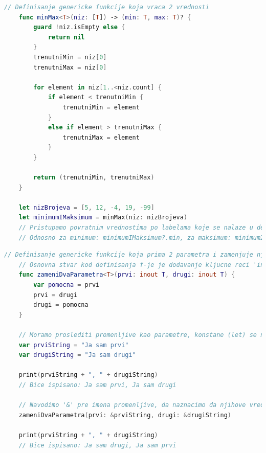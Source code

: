 \documentclass[12pt,oneside]{memoir}
\begin{document}
\begin{lstlisting}[caption=\textit{{Дефинисање и позивање функције са више повратних вредности}}, label={lst:Дефинисање и позивање функције са више повратних вредности}, language=Swift, frame=single]
    // Definisanje genericke funkcije koja vraca 2 vrednosti
    func minMax<T>(niz: [T]) -> (min: T, max: T)? {
        guard !niz.isEmpty else {
            return nil
        }
        trenutniMin = niz[0]
        trenutniMax = niz[0]
        
        for element in niz[1..<niz.count] {
            if element < trenutniMin {
                trenutniMin = element
            }
            else if element > trenutniMax {
                trenutniMax = element
            }
        } 
        
        return (trenutniMin, trenutniMax)
    }
    
    let nizBrojeva = [5, 12, -4, 19, -99]
    let minimumIMaksimum = minMax(niz: nizBrojeva)
    // Pristupamo povratnim vrednostima po labelama koje se nalaze u deklaraciji f-je
    // Odnosno za minimum: minimumIMaksimum?.min, za maksimum: minimumIMaksimum?.max
\end{lstlisting}

\begin{lstlisting}[caption=\textit{{Дефинисање и позивање функције са променљивим параметрима}}, label={lst:Дефинисање и позивање функције са променљивим параметрима}, language=Swift, frame=single]
    // Definisanje genericke funkcije koja prima 2 parametra i zamenjuje njihove vrednosti
    // Osnovna stvar kod definisanja f-je je dodavanje kljucne reci 'inout' pre tipa parametra za koji zelimo da omogucimo menjanje njegove vrednosti u f-ji
    func zameniDvaParametra<T>(prvi: inout T, drugi: inout T) {
        var pomocna = prvi
        prvi = drugi
        drugi = pomocna
    }
    
    // Moramo proslediti promenljive kao parametre, konstane (let) se ne mogu menjati
    var prviString = "Ja sam prvi"
    var drugiString = "Ja sam drugi"
    
    print(prviString + ", " + drugiString)
    // Bice ispisano: Ja sam prvi, Ja sam drugi
    
    // Navodimo '&' pre imena promenljive, da naznacimo da njihove vrednosti mogu biti promenjene u telu f-je
    zameniDvaParametra(prvi: &prviString, drugi: &drugiString)
    
    print(prviString + ", " + drugiString)
    // Bice ispisano: Ja sam drugi, Ja sam prvi
    
\end{lstlisting}
\end{document}
